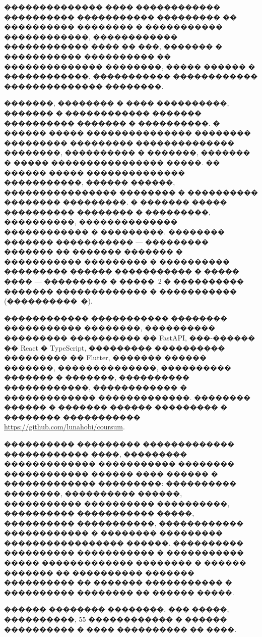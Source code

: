 �������������� ���� ������������ ���������� ����������� ��������� �� ���������� �������� � ����������� ������������\cite{gost7322017,gost712003,gost21052019,gost3460190,gost250102015,gost509222006,gost1920178,gost1930179,fz152}, ������������ ������������ ���� �� ���\cite{metodichka_vkr_ikt_2021}, ������� � ����������� ���������� �� �������������� ��������, ����� ������ � ������������\cite{fowler_patterns_ru,date_intro_db_ru,sommerville2019software,makkakov_allfusion,kaner_testing_en,van_der_linden1997,wainer2000,lord1980}, ����������� ������������ �������������� ��������\cite{fastapi_docs,postgresql_docs,flutter_docs,pydantic_docs,sqlalchemy_docs}.

�������, �������� � ���� ����������, ������� � ������������ ������� ���������� ������� � ����������. � ������ ����� ��������������� �������� ��������� ��������� �������������� ��������, ���������� � �������, ������� � ����� ���������������� �����. �� ������ ����� �������������� �����������, ������ ������, ���������������� �������� � ���������� �������� ���������. � ������� ����� ���������� �������� � ���������, ����������, �������������� ������������ � ���������. �������� ������� ����������� --- ��������� ������� �� ������� ������� � ����������� ��������� � ���������� ��������� ������ ����������� � ����� ���� --- ��������� � �����~2 � ���������� ������� ������������� � ����������� (����������~�).

������������ ����������� �������� ����������� ��������, ���������� ��������� ���������� �� FastAPI, ���-������ �� React � TypeScript, ��������� ���������� ��������� �� Flutter, ������� ������ �������, ��������������, ���������� ������� � �������, ���������� ������������, ������������ � ������������� �������������. �������� ������ � ������� ������ ��������� � �������� ����������� \url{https://github.com/lunahobi/coursum}.

���������� ��������� ������������� ������������ ����, ��������� ������������� ����������� �������� ������������ ������ ���� ������ � ������������� ���������: ���������� ��������, ���������� ������, ����������� ���������� ����������, ���������� ����������� �����, ���������� �����������, ������������ ������������ � �������� ��������� ����������������� ������. ���������� ���������� ����������� � ����������� ����� ������������� �������� � ������ ������� �� ���������� ������� ���������� �� ������� ����������� � ���������� �������� �� ������ �����.

������ �������� ��������, ��� �����, ����������, 55 ������������ � ������ ���������� � ���� ���������� �� ����\cite{metodichka_vkr_ikt_2021,gost7052008}.
